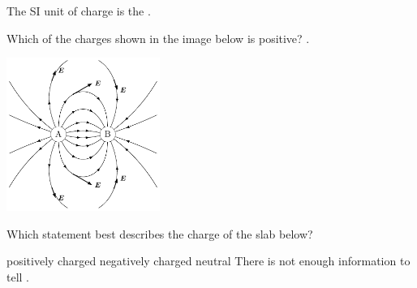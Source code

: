 \documentclass[answers]{exam}
\begin{document}

\begin{questions}

\question
The SI unit of charge is the \fillin[Coulomb][3cm].


\question
Which of the charges shown in the image below is positive? \fillin[A].

\begin{center}
    \includegraphics[width=5cm]{documents/figures/electric-field-lines-1.pdf}
\end{center}


\question
Which statement best describes the charge of the slab below?

\bgroup
\begin{center}
\large
{}
\end{center}
\egroup

\begin{randomizechoices}[keeplast]
    \correctchoice positively charged
    \choice negatively charged
    \choice neutral
    \choice There is not enough information to tell .
\end{randomizechoices}


\end{questions}
\end{document}
